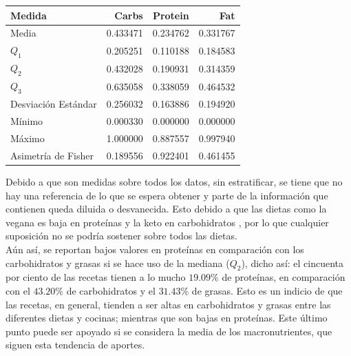 \documentclass[12pt,a4paper]{article}
\begin{document}
        \begin{center}
            \begin{tabular}{l|rrr}
                \toprule
                    Medida & Carbs & Protein & Fat \\  
                \midrule
                    Media               & 0.433471 & 0.234762 & 0.331767 \\
                    $Q_1$               & 0.205251 & 0.110188 & 0.184583 \\
                    $Q_2$               & 0.432028 & 0.190931 & 0.314359 \\
                    $Q_3$               & 0.635058 & 0.338059 & 0.464532 \\
                    Desviación Estándar & 0.256032 & 0.163886 & 0.194920 \\
                    Mínimo              & 0.000330 & 0.000000 & 0.000000 \\
                    Máximo              & 1.000000 & 0.887557 & 0.997940 \\
                    Asimetría de Fisher & 0.189556 & 0.922401 & 0.461455 \\
                \bottomrule
            \end{tabular}
        \end{center}

        Debido a que son medidas sobre todos los datos, sin estratificar, 
        se tiene que no hay una referencia de lo que se espera obtener y 
        parte de la información que contienen queda diluida o desvanecida. 
        Esto debido a que las dietas como la vegana es baja en proteínas y 
        la keto en carbohidratos \cite{marvastipopular}, por lo que cualquier 
        suposición no se podría sostener sobre todos las dietas.\\

        Aún así, se reportan bajos valores en proteínas en comparación 
        con los carbohidratos y grasas si se hace uso de la mediana ($Q_2$), 
        dicho así: el cincuenta por ciento de las recetas tienen a lo mucho  
        $19.09\%$ de proteínas, en comparación con el $43.20\%$ de carbohidratos 
        y el $31.43\%$ de grasas. Esto es un indicio de que las recetas, en general, 
        tienden a ser altas en carbohidratos y grasas entre las diferentes dietas y 
        cocinas; mientras que son bajas en proteínas. Este último punto puede ser 
        apoyado si se considera la media de los macronutrientes, que siguen esta 
        tendencia de aportes.\\
\end{document}
